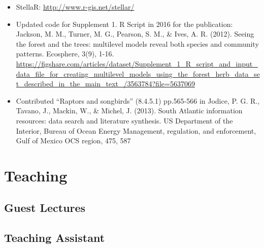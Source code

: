 \documentclass[11pt,a4paper,]{awesome-cv}
\begin{document}
\begin{itemize}
\item
  StellaR: \url{http://www.r-gis.net/stellar/}
\item
  Updated code for Supplement 1. R Script in 2016 for the publication:
  Jackson, M. M., Turner, M. G., Pearson, S. M., \& Ives, A. R. (2012).
  Seeing the forest and the trees: multilevel models reveal both species
  and community patterns. Ecosphere, 3(9), 1-16.
  \url{https://figshare.com/articles/dataset/Supplement_1_R_script_and_input_data_file_for_creating_multilevel_models_using_the_forest_herb_data_set_described_in_the_main_text_/3563784?file=5637069}
\item
  Contributed ``Raptors and songbirds'' (8.4.5.1) pp.565-566 in Jodice,
  P. G. R., Tavano, J., Mackin, W., \& Michel, J. (2013). South Atlantic
  information resources: data search and literature synthesis. US
  Department of the Interior, Bureau of Ocean Energy Management,
  regulation, and enforcement, Gulf of Mexico OCS region, 475, 587
\end{itemize}

\section{Teaching}\label{teaching}

\subsection{Guest Lectures}\label{guest-lectures}

\begin{cventries}
    \vspace{-4.0mm}
    \vspace{-4.0mm}
    \vspace{-4.0mm}
\end{cventries}

\subsection{Teaching Assistant}\label{teaching-assistant}
\end{document}
